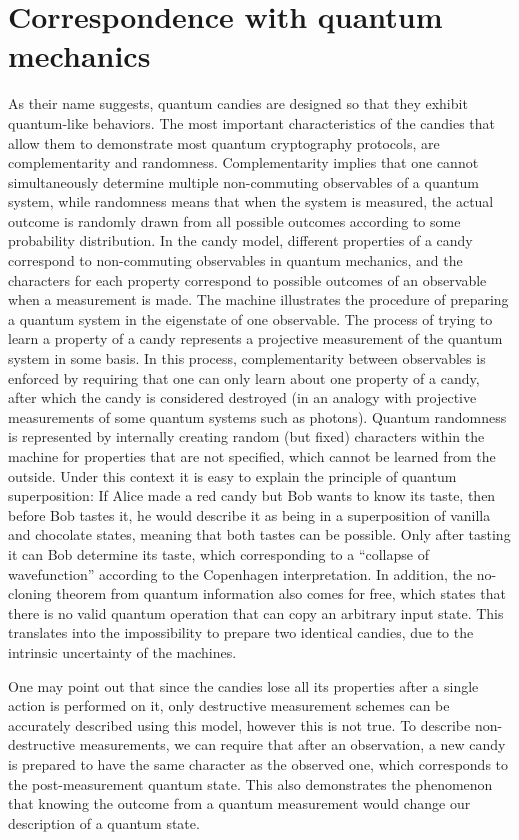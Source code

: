 \documentclass{article}
\begin{document}
\section{Correspondence with quantum mechanics}\label{correspondence section}
As their name suggests, quantum candies are designed so that they exhibit quantum-like behaviors.
The most important characteristics of the candies that allow them to demonstrate most quantum cryptography protocols, are complementarity and randomness.
Complementarity implies that one cannot simultaneously determine multiple non-commuting observables of a quantum system, while randomness means that when the system is measured, the actual outcome is randomly drawn from all possible outcomes according to some probability distribution.
In the candy model, different properties of a candy correspond to non-commuting observables in quantum mechanics, and the characters for each property correspond to possible outcomes of an observable when a measurement is made.
The machine illustrates the procedure of preparing a quantum system in the eigenstate of one observable.
The process of trying to learn a property of a candy represents a projective measurement of the quantum system in some basis.
In this process, complementarity between observables is enforced by requiring that one can only learn about one property of a candy, after which the candy is considered destroyed (in an analogy with projective measurements of some quantum systems such as photons).
Quantum randomness is represented by internally creating random (but fixed) characters within the machine for properties that are not specified, which cannot be learned from the outside.
Under this context it is easy to explain the principle of quantum superposition: If Alice made a red candy but Bob wants to know its taste, then before Bob tastes it, he would describe it as being in a superposition of vanilla and chocolate states, meaning that both tastes can be possible.
Only after tasting it can Bob determine its taste, which corresponding to a ``collapse of wavefunction'' according to the Copenhagen interpretation.
In addition, the no-cloning theorem from quantum information also comes for free, which states that there is no valid quantum operation that can copy an arbitrary input state.
This translates into the impossibility to prepare two identical candies, due to the intrinsic uncertainty of the machines.

One may point out that since the candies lose all its properties after a single action is performed on it, only destructive measurement schemes can be accurately described using this model, however this is not true.
To describe non-destructive measurements, we can require that after an observation, a new candy is prepared to have the same character as the observed one, which corresponds to the post-measurement quantum state.
This also demonstrates the phenomenon that knowing the outcome from a quantum measurement would change our description of a quantum state.
\end{document}
